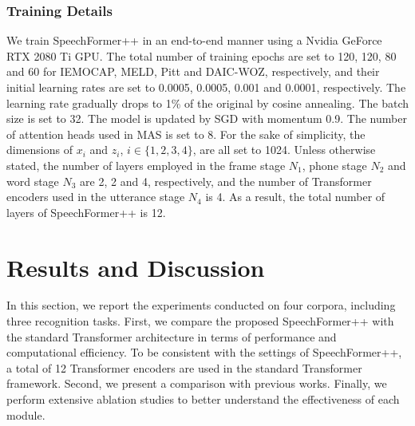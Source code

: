 \documentclass[lettersize,journal]{IEEEtran}
\begin{document}
\subsubsection{Training Details} We train SpeechFormer++ in an end-to-end manner using a Nvidia GeForce RTX 2080 Ti GPU. The total number of training epochs are set to 120, 120, 80 and 60 for IEMOCAP, MELD, Pitt and DAIC-WOZ, respectively, and their initial learning rates are set to 0.0005, 0.0005, 0.001 and 0.0001, respectively. The learning rate gradually drops to 1\% of the original by cosine annealing. The batch size is set to 32. The model is updated by SGD with momentum 0.9. The number of attention heads used in MAS is set to 8. For the sake of simplicity, the dimensions of $x_i$ and $z_i$, $i \in \{1,2,3,4\}$, are all set to 1024. Unless otherwise stated, the number of layers employed in the frame stage $N_1$, phone stage $N_2$ and word stage $N_3$ are 2, 2 and 4, respectively, and the number of Transformer encoders used in the utterance stage $N_4$ is 4. As a result, the total number of layers of SpeechFormer++ is 12.

\section{Results and Discussion}
In this section, we report the experiments conducted on four corpora, including three recognition tasks. First, we compare the proposed SpeechFormer++ with the standard Transformer architecture in terms of performance and computational efficiency. To be consistent with the settings of SpeechFormer++, a total of 12 Transformer encoders are used in the standard Transformer framework. Second, we present a comparison with previous works. Finally, we perform extensive ablation studies to better understand the effectiveness of each module.

\begin{table}[t]
    \caption{Performance and computational efficiency of Transformer and SpeechFormer++ using HuBERT features on MELD.\\Gain indicates the relative improvement (+) or reduction (-)}
    \label{tab_3}
    \centering
\end{table}
\end{document}
